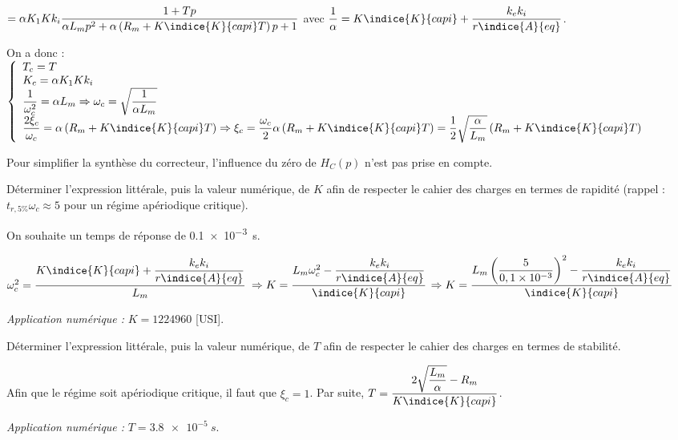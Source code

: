 \begin{corrige}
$=\alpha K_1 Kk_i \dfrac{1+Tp }{\alpha L_mp^2 + \alpha\left(R_m+  K\indice{K}{capi}T\right) p+1} $ avec $\dfrac{1}{\alpha} = K\indice{K}{capi}+\dfrac{k_e k_i}{r\indice{A}{eq}}$.

On a donc : 
$
\left\{
\begin{array}{l}
T_c = T \\
K_c = \alpha K_1 Kk_i  \\
\dfrac{1}{\omega_c^2} = \alpha L_m \Rightarrow  \omega_c = \sqrt{\dfrac{1}{\alpha L_m}} \\
\dfrac{2 \xi_c}{\omega_c} = \alpha\left(R_m+  K\indice{K}{capi}T\right) 
\Rightarrow  \xi_c = \dfrac{\omega_c}{2}\alpha\left(R_m+  K\indice{K}{capi}T\right) = \dfrac{1}{2}\sqrt{\dfrac{\alpha}{ L_m}} \left(R_m+  K\indice{K}{capi}T\right)  \\
\end{array}
\right.
$

\end{corrige}
\else
\fi


Pour simplifier la synthèse du correcteur, l'influence du zéro de $H_{C}(p)$ n'est pas prise en compte.\\

\begin{question}%
\label{2023_ccs_psi_q_17}
Déterminer l'expression littérale, puis la valeur numérique, de $K$ afin de respecter le cahier des charges en termes de rapidité (rappel : $t_{r, 5 \%} \omega_{c} \approx 5$ pour un régime apériodique critique).\\
\end{question}
\ifprof
\begin{corrige}
On souhaite un temps de réponse de \SI{0,1e-3}{s}. 

$\omega_c^2  = \dfrac{K\indice{K}{capi}+\dfrac{k_e k_i}{r\indice{A}{eq}}}{L_m} $
$\Rightarrow K = \dfrac{L_m\omega_c^2 - \dfrac{k_e k_i}{r\indice{A}{eq}}}{\indice{K}{capi}}$
$\Rightarrow K = \dfrac{L_m\left(\dfrac{5}{0,1 \times 10^{-3}} \right)^2 - \dfrac{k_e k_i}{r\indice{A}{eq}}}{\indice{K}{capi}}$

\textit{Application numérique : } $K=1224960$ [USI].

\end{corrige}
\else
\fi


\begin{question}
\label{2023_ccs_psi_q_18}
Déterminer l'expression littérale, puis la valeur numérique, de $T$ afin de respecter le cahier des charges en termes de stabilité.\\
\end{question}
\ifprof
\begin{corrige}
Afin que le régime soit apériodique critique, il faut que $\xi_c = 1$. 
Par suite, $    T = \dfrac{2\sqrt{\dfrac{ L_m}{\alpha}} - R_m }{K\indice{K}{capi}} $.

\textit{Application numérique : } $T=\SI{3,8e-5}{s}$.
\end{corrige}
\else
\fi

